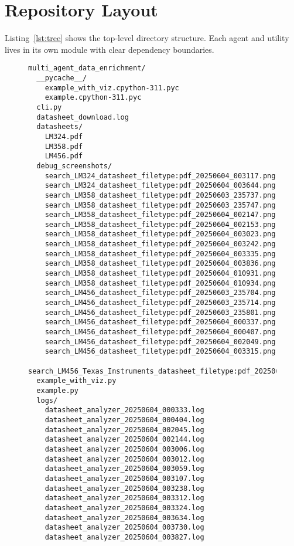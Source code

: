 \section{Repository Layout}
Listing~\ref{lst:tree} shows the top-level directory structure.  Each agent and utility lives in its own module with clear dependency boundaries.
\begin{figure}[H]
\centering
\begin{minipage}{0.9\textwidth}
\begin{verbatim}
multi_agent_data_enrichment/
  __pycache__/
    example_with_viz.cpython-311.pyc
    example.cpython-311.pyc
  cli.py
  datasheet_download.log
  datasheets/
    LM324.pdf
    LM358.pdf
    LM456.pdf
  debug_screenshots/
    search_LM324_datasheet_filetype:pdf_20250604_003117.png
    search_LM324_datasheet_filetype:pdf_20250604_003644.png
    search_LM358_datasheet_filetype:pdf_20250603_235737.png
    search_LM358_datasheet_filetype:pdf_20250603_235747.png
    search_LM358_datasheet_filetype:pdf_20250604_002147.png
    search_LM358_datasheet_filetype:pdf_20250604_002153.png
    search_LM358_datasheet_filetype:pdf_20250604_003023.png
    search_LM358_datasheet_filetype:pdf_20250604_003242.png
    search_LM358_datasheet_filetype:pdf_20250604_003335.png
    search_LM358_datasheet_filetype:pdf_20250604_003836.png
    search_LM358_datasheet_filetype:pdf_20250604_010931.png
    search_LM358_datasheet_filetype:pdf_20250604_010934.png
    search_LM456_datasheet_filetype:pdf_20250603_235704.png
    search_LM456_datasheet_filetype:pdf_20250603_235714.png
    search_LM456_datasheet_filetype:pdf_20250603_235801.png
    search_LM456_datasheet_filetype:pdf_20250604_000337.png
    search_LM456_datasheet_filetype:pdf_20250604_000407.png
    search_LM456_datasheet_filetype:pdf_20250604_002049.png
    search_LM456_datasheet_filetype:pdf_20250604_003315.png
    search_LM456_Texas_Instruments_datasheet_filetype:pdf_20250603_235823.png
  example_with_viz.py
  example.py
  logs/
    datasheet_analyzer_20250604_000333.log
    datasheet_analyzer_20250604_000404.log
    datasheet_analyzer_20250604_002045.log
    datasheet_analyzer_20250604_002144.log
    datasheet_analyzer_20250604_003006.log
    datasheet_analyzer_20250604_003012.log
    datasheet_analyzer_20250604_003059.log
    datasheet_analyzer_20250604_003107.log
    datasheet_analyzer_20250604_003238.log
    datasheet_analyzer_20250604_003312.log
    datasheet_analyzer_20250604_003324.log
    datasheet_analyzer_20250604_003634.log
    datasheet_analyzer_20250604_003730.log
    datasheet_analyzer_20250604_003827.log

\end{verbatim}
\end{minipage}
\end{figure}

